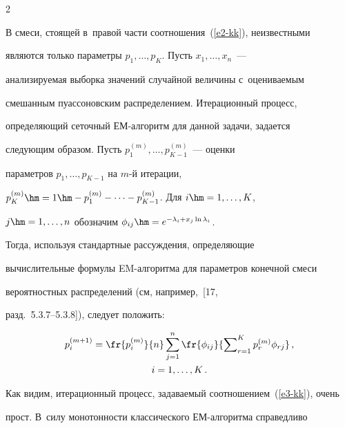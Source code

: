 \begin{multicols}{2}
\begin{equation}
\end{equation}


В смеси, стоящей в~правой части соотношения~(\ref{e2-kk}), неизвестными


являются только па\-ра\-мет\-ры $p_1,\ldots,p_{K}$. Пусть $x_1,\ldots,x_n$~---


анализируемая выборка значений случайной величины с~оце\-ни\-ва\-емым


смешанным пуассоновским распределением. Итерационный процесс,


определяющий сеточный ЕМ-ал\-го\-ритм для данной задачи, задается


следующим образом. Пусть $p_1^{(m)},\ldots,p_{K-1}^{(m)}$~--- оценки


па\-ра\-мет\-ров $p_1,\ldots,p_{K-1}$ на $m$-й итерации,


$p_K^{(m)}\hm=1\hm-p_1^{(m)}-\cdots -p_{K-1}^{(m)}$. Для $i\hm=1,\ldots,K$,


$j\hm=1,\ldots,n$ обозначим $\phi_{ij}\hm=e^{-\lambda_i+x_j\ln \lambda_i}$.


Тогда, используя стандартные рассуждения, определяющие


вычислительные формулы EM-ал\-го\-рит\-ма для параметров конечной смеси


вероятностных распределений (см, например,~[17,


разд.~5.3.7--5.3.8]), следует положить:





\vspace*{-2pt}





\noindent


\begin{multline}


p_i^{(m+1)}=\fr{p_i^{(m)}}{n}\sum\limits_{j=1}^n


\fr{\phi_{ij}}{\sum\nolimits_{r=1}^Kp_r^{(m)}\phi_{rj}}\,,


\\


 i=1,\ldots,K\,.


\label{e3-kk}


\end{multline}


Как видим, итерационный процесс, задаваемый соотношением~(\ref{e3-kk}), очень


прост. В~силу монотонности классического ЕМ-алгоритма справедливо



\end{multicols}
